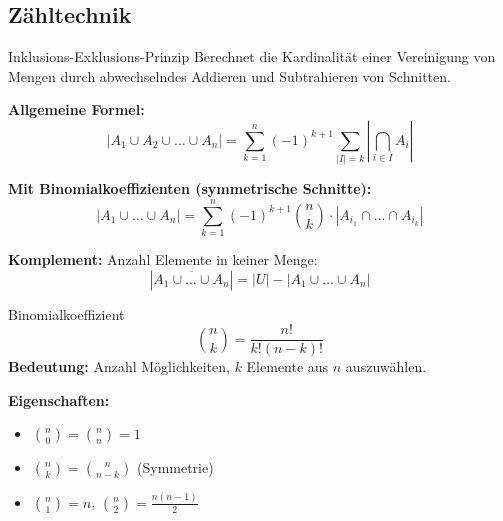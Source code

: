 \documentclass[a4paper, fontsize=7pt]{scrartcl}
\begin{document}

\subsection{Zähltechnik}

\begin{mainbox}{Inklusions-Exklusions-Prinzip}
Berechnet die Kardinalität einer Vereinigung von Mengen durch abwechselndes Addieren und Subtrahieren von Schnitten.

\textbf{Allgemeine Formel:}
\[
|A_1 \cup A_2 \cup \ldots \cup A_n| = \sum_{k=1}^{n} (-1)^{k+1} \sum_{|I|=k} \left|\bigcap_{i \in I} A_i\right|
\]

\textbf{Mit Binomialkoeffizienten (symmetrische Schnitte):}
\[
|A_1 \cup \ldots \cup A_n| = \sum_{k=1}^{n} (-1)^{k+1} \binom{n}{k} \cdot |A_{i_1} \cap \ldots \cap A_{i_k}|
\]

\textbf{Komplement:} Anzahl Elemente in keiner Menge:
\[
|\overline{A_1 \cup \ldots \cup A_n}| = |U| - |A_1 \cup \ldots \cup A_n|
\]
\end{mainbox}

\begin{subbox}{Binomialkoeffizient}
\[
\binom{n}{k} = \frac{n!}{k!(n-k)!}
\]
\textbf{Bedeutung:} Anzahl Möglichkeiten, $k$ Elemente aus $n$ auszuwählen.

\textbf{Eigenschaften:}
\begin{itemize}
  \item $\binom{n}{0} = \binom{n}{n} = 1$
  \item $\binom{n}{k} = \binom{n}{n-k}$ (Symmetrie)
  \item $\binom{n}{1} = n$, \quad $\binom{n}{2} = \frac{n(n-1)}{2}$
\end{itemize}
\end{subbox}
\end{document}
